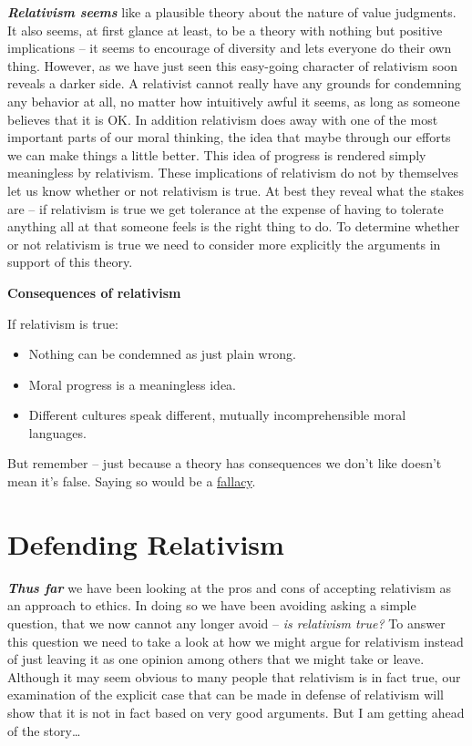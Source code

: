\documentclass[12pt, openany]{book}
\makeatletter
\providecommand{\tightlist}{%
  \setlength{\itemsep}{0pt}\setlength{\parskip}{0pt}}
\newenvironment{kframe}{%
\medskip{}
\setlength{\fboxsep}{.8em}
 \def\at@end@of@kframe{}%
 \ifinner\ifhmode%
  \def\at@end@of@kframe{\end{minipage}}%
  \begin{minipage}{\columnwidth}%
 \fi\fi%
 \def\FrameCommand##1{\hskip\@totalleftmargin \hskip-\fboxsep
 \colorbox{shadecolor}{##1}\hskip-\fboxsep
     \hskip-\linewidth \hskip-\@totalleftmargin \hskip\columnwidth}%
 \MakeFramed {\advance\hsize-\width
   \@totalleftmargin\z@ \linewidth\hsize
   \@setminipage}}%
 {\par\unskip\endMakeFramed%
 \at@end@of@kframe}
\newenvironment{rmdblock}[1]
  {
  \begin{itemize}
  \renewcommand{\labelitemi}{
    \raisebox{-.7\height}[0pt][0pt]{
      {\setkeys{Gin}{width=3em,keepaspectratio}\texttt{[image: img/\#1]}}
    }
  }
  \setlength{\fboxsep}{1em}
  \begin{kframe}
  \item
  }
  {
  \end{kframe}
  \end{itemize}
  }
\newenvironment{rmdcaution}
  {\begin{rmdblock}{caution}}
  {\end{rmdblock}}
\makeatother
\begin{document}
\textbf{\emph{Relativism seems}} like a plausible theory about the nature of value judgments. It also seems, at first glance at least, to be a theory with nothing but positive implications -- it seems to encourage of diversity and lets everyone do their own thing. However, as we have just seen this easy-going character of relativism soon reveals a darker side. A relativist cannot really have any grounds for condemning any behavior at all, no matter how intuitively awful it seems, as long as someone believes that it is OK. In addition relativism does away with one of the most important parts of our moral thinking, the idea that maybe through our efforts we can make things a little better. This idea of progress is rendered simply meaningless by relativism. These implications of relativism do not by themselves let us know whether or not relativism is true. At best they reveal what the stakes are -- if relativism is true we get tolerance at the expense of having to tolerate anything all at that someone feels is the right thing to do. To determine whether or not relativism is true we need to consider more explicitly the arguments in support of this theory.

\begin{rmdcaution}

\textbf{Consequences of relativism}

If relativism is true:

\begin{itemize}
\tightlist
\item
  Nothing can be condemned as just plain wrong.
\item
  Moral progress is a meaningless idea.
\item
  Different cultures speak different, mutually incomprehensible moral languages.
\end{itemize}

But remember -- just because a theory has consequences we don't like doesn't mean it's false. Saying so would be a \protect\hyperlink{appeal-to-consequences}{fallacy}.

\end{rmdcaution}

\hypertarget{defending-relativism}{%
\section{Defending Relativism}\label{defending-relativism}}

\textbf{\emph{Thus far}} we have been looking at the pros and cons of accepting relativism as an approach to ethics. In doing so we have been avoiding asking a simple question, that we now cannot any longer avoid -- \emph{is relativism true?} To answer this question we need to take a look at how we might argue for relativism instead of just leaving it as one opinion among others that we might take or leave. Although it may seem obvious to many people that relativism is in fact true, our examination of the explicit case that can be made in defense of relativism will show that it is not in fact based on very good arguments. But I am getting ahead of the story\ldots{}
\end{document}
